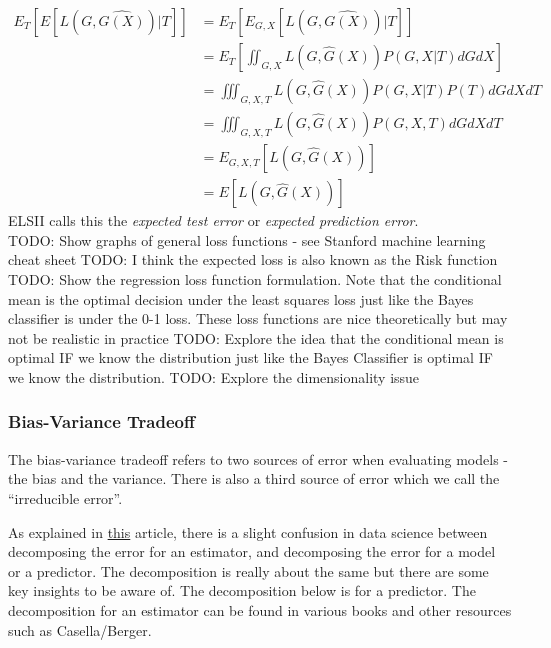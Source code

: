 \documentclass[paper=a4, fontsize=11pt]{scrartcl} %
\numberwithin{equation}{section} %
\numberwithin{figure}{section} %
\numberwithin{table}{section} %
\begin{document}
\begin{equation}
\begin{split}
E_{T}[E[L(G, \hat{G(X)})|T]] &= E_{T}[E_{G,X}[L(G, \hat{G(X)})|T]] \\
&= E_{T}\left[\iint_{G, X} {L(G, \hat{G}(X)) P(G,X|T) dG dX}\right]\\
&= \iiint_{G, X, T} {L(G, \hat{G}(X)) P(G,X|T) P(T) dG dX dT} \\
&= \iiint_{G, X, T} {L(G, \hat{G}(X)) P(G,X,T) dG dX dT}\\
&= E_{G,X,T}[L(G, \hat{G}(X))]\\
&= E[L(G, \hat{G}(X))]
\end{split}
\end{equation}
ELSII calls this the \emph{expected test error} or \emph{expected prediction error}.\\

\noindent TODO: Show graphs of general loss functions - see Stanford machine learning cheat sheet \newline
TODO: I think the expected loss is also known as the Risk function \newline
TODO: Show the regression loss function formulation. Note that the conditional mean is the optimal decision under the least squares loss just like the Bayes classifier is under the 0-1 loss. These loss functions are nice theoretically but may not be realistic in practice \newline
TODO: Explore the idea that the conditional mean is optimal IF we know the distribution just like the Bayes Classifier is optimal IF we know the distribution. \newline
TODO: Explore the dimensionality issue

\subsubsection{Bias-Variance Tradeoff}

The bias-variance tradeoff refers to two sources of error when evaluating models - the bias and the variance. There is also a third source of error which we call the ``irreducible error''. 

As explained in \href{https://towardsdatascience.com/mse-and-bias-variance-decomposition-77449dd2ff55}{this} article, there is a slight confusion in data science between decomposing the error for an \gls{estimator}, and decomposing the error for a model or a predictor. The decomposition is really about the same but there are some key insights to be aware of. The decomposition below is for a predictor. The decomposition for an estimator can be found in various books and other resources such as Casella/Berger. 
\end{document}
